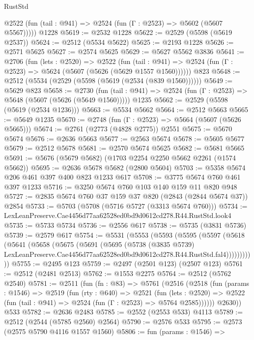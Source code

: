 \begin{lexlean}{RustStd}
\begin{coremodule}
      @2522 (fun (tail : @941) => @2524 (fun (Γ : @2523) => @5602 (@5607 @5567)))))
    @1228
@5619 := @2532 @1228
@5622 := @2529 (@5598 (@5619 @2537))
@5624 := @2512 (@5534 @5622)
@5625 := @2193 @1228
@5626 := @2571 @5625
@5627 := @2574 @5625
@5629 := @5627 @5562 @3836
@5641 := @2706
    (fun (lets : @2520) =>
    @2522
      (fun (tail : @941) => @2524 (fun (Γ : @2523) => @5624 (@5607 (@5626 (@5629 @1557 @1560))))))
    @823
@5648 := @2512 (@5534 (@2529 (@5598 (@5619 (@2534 (@839 @1560))))))
@5649 := @5629 @823
@5658 := @2730
    (fun (tail : @941) => @2524 (fun (Γ : @2523) => @5648 (@5607 (@5626 (@5649 @1560)))))
    @1235
@5662 := @2529 (@5598 (@5619 (@2534 @1236)))
@5663 := @5534 @5662
@5664 := @2512 @5663
@5665 := @5649 @1235
@5670 := @2748 (fun (Γ : @2523) => @5664 (@5607 (@5626 @5665)))
@5674 := @2761 (@2773 (@4828 @2775)) @2551
@5675 := @5670 @5674
@5676 := @2636 @5663
@5677 := @2563 @5674
@5678 := @5605 @5677
@5679 := @2512 @5678
@5681 := @2570 @5674 @5625
@5682 := @5681 @5665
@5691 := @5676 (@5679 @5682) (@1703 @2254 @2250 @5662 @2261 (@1574 @5662))
@5695 := @2636 @5678 @5682 (@2800 @5604)
@5703 := @5358 @5674 @206 @461 @397 @400 @823 @1233 @617
@5708 := @3775 @5674 @760 @461 @397 @1233
@5716 := @3250 @5674 @760 @103 @140 @159 @11 @820 @948
@5727 := @2835 @5674 @760 @37 @159 @37 @820 (@2843 (@2844 @5674 @37)) @2854
@5733 := @5703 (@5708 (@5716 @5727 (@3313 @5674 @760)))
@5734 := LexLeanPreserve.Cae4456d77aa62528ed0bd9d0612cd278.R44.RustStd.look4
@5735 := @5733 @5734
@5736 := @2556 @617
@5738 := @5735 (@3831 @5736)
@5739 := @2579 @617
@5754 := @5531
    (@5553
      (@5593
        (@5595
          (@5597
            (@5618
              (@5641
                (@5658
                  (@5675
                    (@5691
                      (@5695
                        (@5738
                          (@3835 @5739)
                          LexLeanPreserve.Cae4456d77aa62528ed0bd9d0612cd278.R44.RustStd.fal4)))))))))))
@5755 := @2495 @123
@5759 := @2497 (@2501 @123) (@2507 @123)
@5761 := @2512 (@2481 @2513)
@5762 := @1553 @2275
@5764 := @2512 (@5762 @2540)
@5781 := @2511
    (fun (fn : @83) =>
    @5761
      (@2516
        (@2518
          (fun (params : @1546) =>
          @2519
            (fun (rty : @640) =>
            @2521
              (fun (lets : @2520) =>
              @2522 (fun (tail : @941) => @2524 (fun (Γ : @2523) => @5764 @2585))))))
        @2630))
    @533
@5782 := @2636 @2483
@5785 := @2552 (@2553 @533) @4113
@5789 := @2512 (@2544 (@5785 @2560) @2564)
@5790 := @2576 @533
@5795 := @2573 (@2575 @5790 @4116 @1557 @1560)
@5806 := fun (params : @1546) =>

\end{coremodule}
\end{lexlean}
